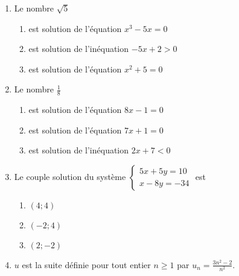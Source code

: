 \documentclass[oneside,twocolumn,landscape]{book}
\begin{document}
\begin{enumerate}
\begin{enumerate}
\end{enumerate}



\item Le nombre $\sqrt{5}$

\begin{enumerate}


\item\BonneReponse est solution de l'équation $x^{3}-5x=0$

\item\MauvaiseReponse est solution de l'inéquation $-5x+2>0$
\item\MauvaiseReponse est solution de l'équation $x^{2}+5=0$

\end{enumerate}

\newpage

\item Le nombre $\frac{1}{8}$

\begin{enumerate}


\item\BonneReponse est solution de l'équation $8x-1=0$
\item\MauvaiseReponse est solution de l'équation $7x+1=0$

\item\MauvaiseReponse est solution de l'inéquation $2x+7<0$

\end{enumerate}



\item Le couple solution du système $\left\{\begin{array}{c}5x+5y=10 \\ x-8y=-34\end{array}\right.$ est

\begin{enumerate}

\item\MauvaiseReponse $(4;4)$

\item\BonneReponse $(-2 ;4)$
\item\MauvaiseReponse $(2 ; -2)$


\end{enumerate}






\item $u$ est la suite définie pour tout entier $n \geqslant 1$ par $u_{n}=\frac{3n^{2}-2}{n^{2}}$.


\end{enumerate}
\end{document}
